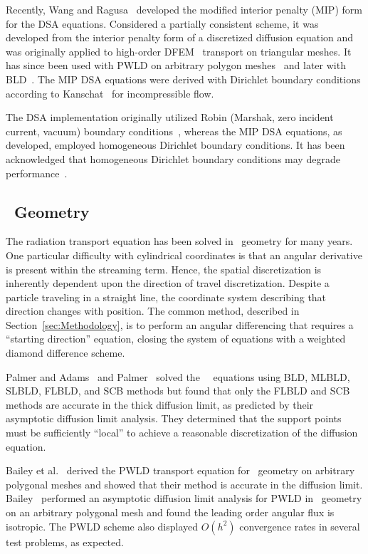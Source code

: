 \documentclass{article}
\begin{document}
Recently, Wang and Ragusa~\cite{WangRagusaDSA} developed the modified interior penalty (MIP) form for the DSA equations. Considered a partially consistent scheme, it was developed from the interior penalty form of a discretized diffusion equation and was originally applied to high-order DFEM \SN\ transport on triangular meshes. It has since been used with PWLD on arbitrary polygon meshes~\cite{TurcksinDiscontinuousDSA} and later with BLD~\cite{TurcksinDSABLD}. The MIP DSA equations were derived with Dirichlet boundary conditions according to Kanschat~\cite{KanschatDGViscousIncompressFlow} for incompressible flow.

The DSA implementation originally utilized Robin (Marshak, zero incident current, vacuum) boundary conditions~\cite{AdamsDSADFEM, WarsaFullyConsistentLDDSA}, whereas the MIP DSA equations, as developed, employed homogeneous Dirichlet boundary conditions. It has been acknowledged that homogeneous Dirichlet boundary conditions may degrade performance~\cite{WangDissertation}.

\subsection{\RZ\ Geometry}
The radiation transport equation has been solved in \RZ\ geometry for many years. One particular difficulty with cylindrical coordinates is that an angular derivative is present within the streaming term. Hence, the spatial discretization is inherently dependent upon the direction of travel discretization. Despite a particle traveling in a straight line, the coordinate system describing that direction changes with position. The common method, described in Section~\ref{sec:Methodology}, is to perform an angular differencing that requires a ``starting direction'' equation, closing the system of equations with a weighted diamond difference scheme.

Palmer and Adams~\cite{PalmerCurvilinearTransport} and Palmer~\cite{PalmerDissertation} solved the \RZ\ \SN\ equations using BLD, MLBLD, SLBLD, FLBLD, and SCB methods but found that only the FLBLD and SCB methods are accurate in the thick diffusion limit, as predicted by their asymptotic diffusion limit analysis. They determined that the support points must be sufficiently ``local'' to achieve a reasonable discretization of the diffusion equation.

Bailey et al.~\cite{BaileyDFEMCylindrical} derived the PWLD transport equation for \RZ\ geometry on arbitrary polygonal meshes and showed that their method is accurate in the diffusion limit. Bailey~\cite{BaileyDissertation} performed an asymptotic diffusion limit analysis for PWLD in \RZ\ geometry on an arbitrary polygonal mesh and found the leading order angular flux is isotropic. The PWLD scheme also displayed $O(h^2)$ convergence rates in several test problems, as expected.
\end{document}

